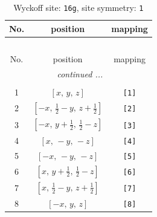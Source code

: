 \documentclass[fleqn,8pt]{jsarticle}
\begin{document}
\renewcommand{\arraystretch}{1.2}
\begin{longtable}{ccc}
\caption{Wyckoff site: {\tt 16g}, site symmetry: {\tt 1}}
 \\
 \hline \hline
No. & position & mapping \\ \hline \endfirsthead

\multicolumn{2}{l}{\tablename\ \thetable{}} \\
 \hline \hline
No. & position & mapping \\ \hline \endhead

 \hline \hline
\multicolumn{2}{r}{\footnotesize\it continued ...} \\ \endfoot

 \hline \hline
\multicolumn{2}{r}{} \\ \endlastfoot

1 & $\left[ x,\, y,\, z \right]$ & {\tt [1]} \\ \hline
2 & $\left[ - x,\, \frac{1}{2} - y,\, z + \frac{1}{2} \right]$ & {\tt [2]} \\ \hline
3 & $\left[ - x,\, y + \frac{1}{2},\, \frac{1}{2} - z \right]$ & {\tt [3]} \\ \hline
4 & $\left[ x,\, - y,\, - z \right]$ & {\tt [4]} \\ \hline
5 & $\left[ - x,\, - y,\, - z \right]$ & {\tt [5]} \\ \hline
6 & $\left[ x,\, y + \frac{1}{2},\, \frac{1}{2} - z \right]$ & {\tt [6]} \\ \hline
7 & $\left[ x,\, \frac{1}{2} - y,\, z + \frac{1}{2} \right]$ & {\tt [7]} \\ \hline
8 & $\left[ - x,\, y,\, z \right]$ & {\tt [8]} \\
\end{longtable}
\end{document}
